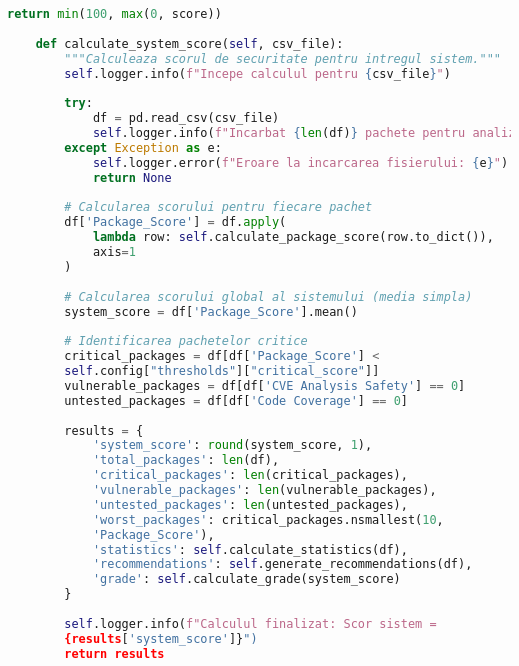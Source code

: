 \documentclass[12pt,a4paper]{article}
\begin{document}
\begin{lstlisting}[language=Python, caption=Script final pentru calcularea scorului de securitate (fără simulări), label=lst:final_security_calculator]
        return min(100, max(0, score))
    
    def calculate_system_score(self, csv_file):
        """Calculeaza scorul de securitate pentru intregul sistem."""
        self.logger.info(f"Incepe calculul pentru {csv_file}")
        
        try:
            df = pd.read_csv(csv_file)
            self.logger.info(f"Incarbat {len(df)} pachete pentru analiza")
        except Exception as e:
            self.logger.error(f"Eroare la incarcarea fisierului: {e}")
            return None
        
        # Calcularea scorului pentru fiecare pachet
        df['Package_Score'] = df.apply(
            lambda row: self.calculate_package_score(row.to_dict()), 
            axis=1
        )
        
        # Calcularea scorului global al sistemului (media simpla)
        system_score = df['Package_Score'].mean()
        
        # Identificarea pachetelor critice
        critical_packages = df[df['Package_Score'] < 
        self.config["thresholds"]["critical_score"]]
        vulnerable_packages = df[df['CVE Analysis Safety'] == 0]
        untested_packages = df[df['Code Coverage'] == 0]
        
        results = {
            'system_score': round(system_score, 1),
            'total_packages': len(df),
            'critical_packages': len(critical_packages),
            'vulnerable_packages': len(vulnerable_packages),
            'untested_packages': len(untested_packages),
            'worst_packages': critical_packages.nsmallest(10, 
            'Package_Score'),
            'statistics': self.calculate_statistics(df),
            'recommendations': self.generate_recommendations(df),
            'grade': self.calculate_grade(system_score)
        }
        
        self.logger.info(f"Calculul finalizat: Scor sistem = 
        {results['system_score']}")
        return results
    

\end{lstlisting}
\end{document}
